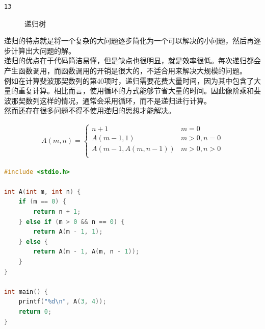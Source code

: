 \begin{tcolorbox}
	\begin{verbatim}
13
	\end{verbatim}
\end{tcolorbox}

\begin{figure}[H]
	\centering
	\caption{递归树}
\end{figure}

递归的特点就是将一个复杂的大问题逐步简化为一个可以解决的小问题，然后再逐步计算出大问题的解。\\

递归的优点在于代码简洁易懂，但是缺点也很明显，就是效率很低。每次递归都会产生函数调用，而函数调用的开销是很大的，不适合用来解决大规模的问题。\\

例如在计算斐波那契数列的第40项时，递归需要花费大量时间，因为其中包含了大量的重复计算。相比而言，使用循环的方式能够节省大量的时间。因此像阶乘和斐波那契数列这样的情况，通常会采用循环，而不是递归进行计算。\\

然而还存在很多问题不得不使用递归的思想才能解决。\\


\begin{align}\nonumber
	A(m, n) =
	\begin{cases}
		n + 1             & m = 0        \\
		A(m-1, 1)         & m > 0, n = 0 \\
		A(m-1, A(m, n-1)) & m > 0, n > 0 \\
	\end{cases}
\end{align}

\begin{lstlisting}[language=C]
#include <stdio.h>

int A(int m, int n) {
	if (m == 0) {
		return n + 1;
	} else if (m > 0 && n == 0) {
		return A(m - 1, 1);
	} else {
		return A(m - 1, A(m, n - 1));
	}
}

int main() {
	printf("%d\n", A(3, 4));
	return 0;
}
\end{lstlisting}

